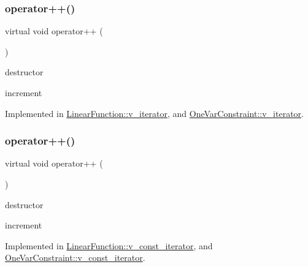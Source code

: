 \subsubsection{\texorpdfstring{operator++()}{operator++()}\hspace{0.1cm}{\footnotesize\ttfamily [1/2]}}
{\footnotesize\ttfamily virtual void operator++ (\begin{DoxyParamCaption}\item[{void}]{ }\end{DoxyParamCaption})\hspace{0.3cm}{\ttfamily [pure virtual]}}



destructor 

increment 

Implemented in \mbox{\hyperlink{class_s_m_spp__di__unipi__it_1_1_linear_function_1_1v__iterator_af860fe44bc54c0cbca8e733ab0e954e0}{Linear\+Function\+::v\+\_\+iterator}}, and \mbox{\hyperlink{class_s_m_spp__di__unipi__it_1_1_one_var_constraint_1_1v__iterator_af860fe44bc54c0cbca8e733ab0e954e0}{One\+Var\+Constraint\+::v\+\_\+iterator}}.

\mbox{\label{group___thin_var_dep_interface___c_l_a_s_s_e_s_ga79fc9d17094dc591d6b48bc296028d51}} 
\subsubsection{\texorpdfstring{operator++()}{operator++()}\hspace{0.1cm}{\footnotesize\ttfamily [2/2]}}
{\footnotesize\ttfamily virtual void operator++ (\begin{DoxyParamCaption}\item[{void}]{ }\end{DoxyParamCaption})\hspace{0.3cm}{\ttfamily [pure virtual]}}



destructor 

increment 

Implemented in \mbox{\hyperlink{class_s_m_spp__di__unipi__it_1_1_linear_function_1_1v__const__iterator_af860fe44bc54c0cbca8e733ab0e954e0}{Linear\+Function\+::v\+\_\+const\+\_\+iterator}}, and \mbox{\hyperlink{class_s_m_spp__di__unipi__it_1_1_one_var_constraint_1_1v__const__iterator_af860fe44bc54c0cbca8e733ab0e954e0}{One\+Var\+Constraint\+::v\+\_\+const\+\_\+iterator}}.

